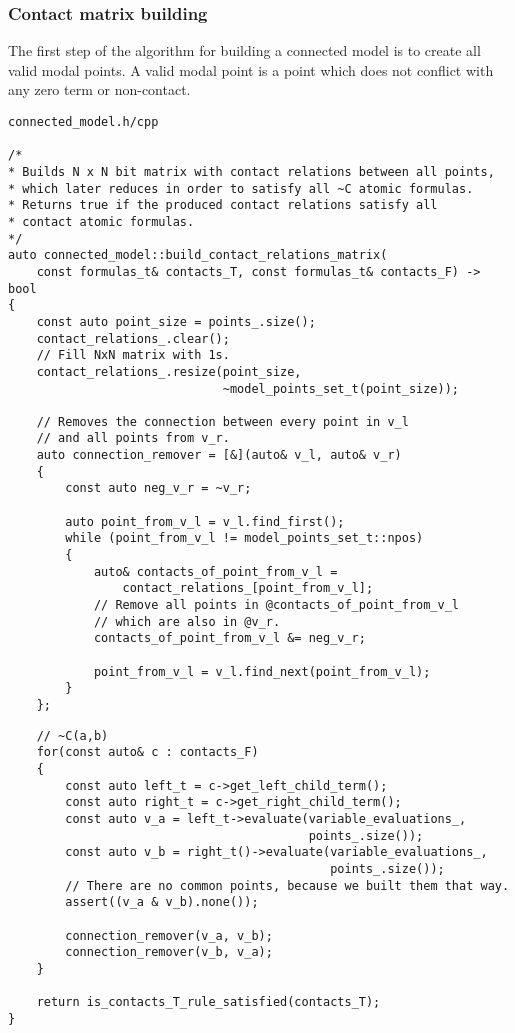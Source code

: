 \documentclass{article}
\begin{document}
	\subsubsection*{Contact matrix building}
	The first step of the algorithm for building a connected model is to create all valid modal points. A valid modal point is a point which does not conflict with any zero term or non-contact.
\\
\begin{lstlisting}
connected_model.h/cpp

/*
* Builds N x N bit matrix with contact relations between all points,
* which later reduces in order to satisfy all ~C atomic formulas.
* Returns true if the produced contact relations satisfy all
* contact atomic formulas.
*/
auto connected_model::build_contact_relations_matrix(
    const formulas_t& contacts_T, const formulas_t& contacts_F) -> bool
{
    const auto point_size = points_.size();
    contact_relations_.clear();
    // Fill NxN matrix with 1s.
    contact_relations_.resize(point_size,
                              ~model_points_set_t(point_size));

    // Removes the connection between every point in v_l
    // and all points from v_r.
    auto connection_remover = [&](auto& v_l, auto& v_r)
    {
        const auto neg_v_r = ~v_r;

        auto point_from_v_l = v_l.find_first();
        while (point_from_v_l != model_points_set_t::npos)
        {
            auto& contacts_of_point_from_v_l =
                contact_relations_[point_from_v_l];
            // Remove all points in @contacts_of_point_from_v_l
            // which are also in @v_r.
            contacts_of_point_from_v_l &= neg_v_r;

            point_from_v_l = v_l.find_next(point_from_v_l);
        }
    };
\end{lstlisting}
\newpage
\begin{lstlisting}
    // ~C(a,b)
    for(const auto& c : contacts_F)
    {
        const auto left_t = c->get_left_child_term();
        const auto right_t = c->get_right_child_term();
        const auto v_a = left_t->evaluate(variable_evaluations_,
                                          points_.size());
        const auto v_b = right_t()->evaluate(variable_evaluations_,
                                             points_.size());
		// There are no common points, because we built them that way.
        assert((v_a & v_b).none());

        connection_remover(v_a, v_b);
        connection_remover(v_b, v_a);
    }

    return is_contacts_T_rule_satisfied(contacts_T);
}
\end{lstlisting}
\end{document}
